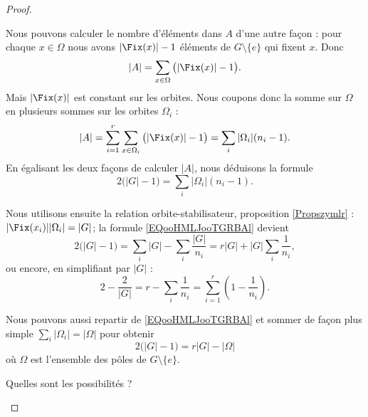 \begin{proof}
\begin{subproof}
            Nous pouvons calculer le nombre d'éléments dans \( A \) d'une autre façon : pour chaque \( x\in \Omega\) nous avons \( | \Fix(x) |-1\) éléments de \( G\setminus\{ e \}\) qui fixent \( x\). Donc
            \begin{equation}
                | A |=\sum_{x\in\Omega}\big( | \Fix(x) |-1 \big).
            \end{equation}
            Mais \( | \Fix(x) |\) est constant sur les orbites. Nous coupons donc la somme sur \( \Omega\) en plusieurs sommes sur les orbites \( \Omega_i\) :
            \begin{equation}
                | A |=\sum_{i=1}^r\sum_{x\in \Omega_i}\big( | \Fix(x) |-1 \big)=\sum_i| \Omega_i |(n_i-1).
            \end{equation}
            En égalisant les deux façons de calculer \( | A |\), nous déduisons la formule
            \begin{equation}        \label{EQooHMLJooTGRBAl}
                2\big( | G |-1 \big)=\sum_i| \Omega_i |(n_i-1).
            \end{equation}
            
            Nous utilisons ensuite la relation orbite-stabilisateur, proposition \ref{Propszymlr} : \( | \Fix(x_i) | |\Omega_i |=| G |\); la formule \eqref{EQooHMLJooTGRBAl} devient
            \begin{equation}
                2\big( | G |-1 \big)=\sum_i| G |-\sum_i\frac{ | G | }{ n_i }=r| G |+| G |\sum_i\frac{1}{ n_i },
            \end{equation}
            ou encore, en simplifiant par \( | G |\) :
            \begin{equation}        \label{EQooAMVBooDVcYeG}
                2-\frac{ 2 }{ | G | }=r-\sum_i\frac{1}{ n_i }=\sum_{i=1}^r\left( 1-\frac{1}{ n_i } \right).
            \end{equation}

            Nous pouvons aussi repartir de \eqref{EQooHMLJooTGRBAl} et sommer de façon plus simple \( \sum_i| \Omega_i |=| \Omega |\) pour obtenir
            \begin{equation}        \label{EQooTHUIooUEXsNl}
                2\big( | G |-1 \big)=r| G |-| \Omega |
            \end{equation}
            où \( \Omega\) est l'ensemble des pôles de \( G\setminus\{ e \}\).
            
        \item[Quelles sont les possibilités ?]


\end{subproof}
\end{proof}
